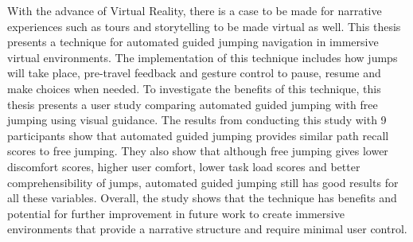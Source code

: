 \label{Abstract}
With the advance of Virtual Reality, there is a case to be made for narrative experiences such as tours and storytelling to be made virtual as well. This thesis presents a technique for automated guided jumping navigation in immersive virtual environments. The implementation of this technique includes how jumps will take place, pre-travel feedback and gesture control to pause, resume and make choices when needed. To investigate the benefits of this technique, this thesis presents a user study comparing automated guided jumping with free jumping using visual guidance. The results from conducting this study with 9 participants show that automated guided jumping provides similar path recall scores to free jumping. They also show that although free jumping gives lower discomfort scores, higher user comfort, lower task load scores and better comprehensibility of jumps, automated guided jumping still has good results for all these variables. Overall, the study shows that the technique has benefits and potential for further improvement in future work to create immersive environments that provide a narrative structure and require minimal user control.